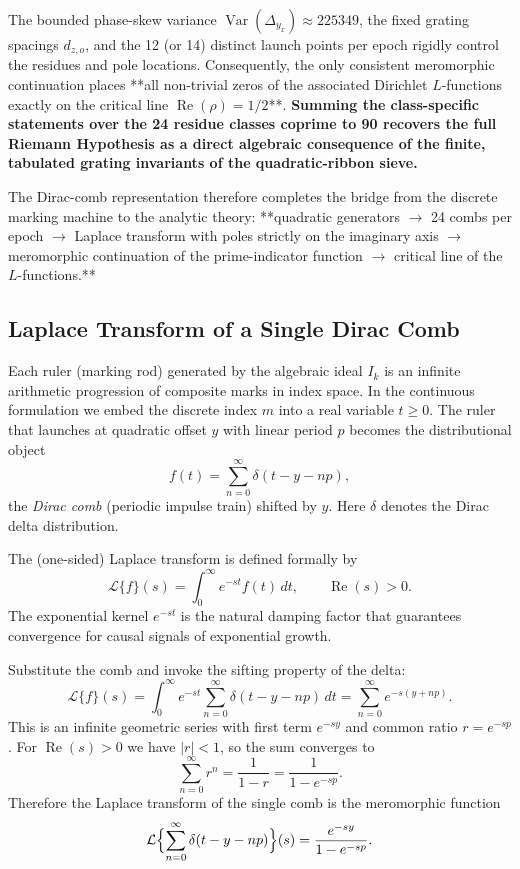 \documentclass[11pt,a4paper]{article}
\begin{document}
The bounded phase-skew variance \(\operatorname{Var}(\Delta_{y_x}) \approx 225349\), the fixed grating spacings \(d_{z,o}\), and the 12 (or 14) distinct launch points per epoch rigidly control the residues and pole locations. Consequently, the only consistent meromorphic continuation places **all non-trivial zeros of the associated Dirichlet \(L\)-functions exactly on the critical line \(\operatorname{Re}(\rho) = 1/2\)**. \textbf{Summing the class-specific statements over the 24 residue classes coprime to 90 recovers the full Riemann Hypothesis as a direct algebraic consequence of the finite, tabulated grating invariants of the quadratic-ribbon sieve.}

The Dirac-comb representation therefore completes the bridge from the discrete marking machine to the analytic theory:  
**quadratic generators \(\to\) 24 combs per epoch \(\to\) Laplace transform with poles strictly on the imaginary axis \(\to\) meromorphic continuation of the prime-indicator function \(\to\) critical line of the \(L\)-functions.**


\subsection{Laplace Transform of a Single Dirac Comb}

Each ruler (marking rod) generated by the algebraic ideal \(I_k\) is an infinite arithmetic progression of composite marks in index space. In the continuous formulation we embed the discrete index \(m\) into a real variable \(t\geq0\). The ruler that launches at quadratic offset \(y\) with linear period \(p\) becomes the distributional object
\[
f(t)=\sum_{n=0}^\infty\delta(t-y-np),
\]
the \emph{Dirac comb} (periodic impulse train) shifted by \(y\). Here \(\delta\) denotes the Dirac delta distribution.

The (one-sided) Laplace transform is defined formally by
\[
\mathcal{L}\{f\}(s)=\int_0^\infty e^{-st}f(t)\,dt,\qquad\operatorname{Re}(s)>0.
\]
The exponential kernel \(e^{-st}\) is the natural damping factor that guarantees convergence for causal signals of exponential growth.

Substitute the comb and invoke the sifting property of the delta:
\[
\mathcal{L}\{f\}(s)=\int_0^\infty e^{-st}\sum_{n=0}^\infty\delta(t-y-np)\,dt=\sum_{n=0}^\infty e^{-s(y+np)}.
\]
This is an infinite geometric series with first term \(e^{-sy}\) and common ratio \(r=e^{-sp}\). For \(\operatorname{Re}(s)>0\) we have \(|r|<1\), so the sum converges to
\[
\sum_{n=0}^\infty r^n=\frac{1}{1-r}=\frac{1}{1-e^{-sp}}.
\]
Therefore the Laplace transform of the single comb is the meromorphic function
\[
\mathcal{L}\Bigl\{\sum_{n=0}^\infty\delta(t-y-np)\Bigr\}(s)=\frac{e^{-sy}}{1-e^{-sp}}.
\]
\end{document}
